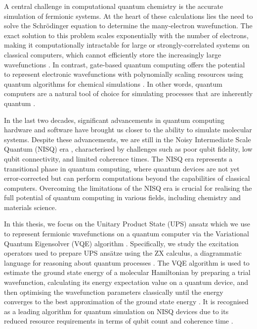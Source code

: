A central challenge in computational quantum chemistry is the accurate simulation of fermionic systems. At the heart of these calculations lies the need to solve the Schrödinger equation to determine the many-electron wavefunction. The exact solution to this problem scales exponentially with the number of electrons, making it computationally intractable for large or strongly-correlated systems on classical computers, which cannot efficiently store the increasingly large wavefunctions \cite{Szalay2011}. In contrast, gate-based quantum computing offers the potential to represent electronic wavefunctions with polynomially scaling resources using quantum algorithms for chemical simulations \cite{Kassal2011}. In other words, quantum computers are a natural tool of choice for simulating processes that are inherently quantum \cite{Yeung2020}.

In the last two decades, significant advancements in quantum computing hardware and software have brought us closer to the ability to simulate molecular systems. Despite these advancements, we are still in the Noisy Intermediate Scale Quantum (NISQ) era \cite{Preskill2018}, characterised by challenges such as poor qubit fidelity, low qubit connectivity, and limited coherence times. The NISQ era represents a transitional phase in quantum computing, where quantum devices are not yet error-corrected but can perform computations beyond the capabilities of classical computers. Overcoming the limitations of the NISQ era is crucial for realising the full potential of quantum computing in various fields, including chemistry and materials science.

In this thesis, we focus on the Unitary Product State (UPS) ansatz which we use to represent fermionic wavefunctions on a quantum computer \cite{Burton2023} via the Variational Quantum Eigensolver (VQE) algorithm \cite{Wecker2015}. Specifically, we study the excitation operators used to prepare UPS ansätze using the ZX calculus, a diagrammatic language for reasoning about quantum processes \cite{Coecke2011}. The VQE algorithm is used to estimate the ground state energy of a molecular Hamiltonian by preparing a trial wavefunction, calculating its energy expectation value on a quantum device, and then optimising the wavefunction parameters classically until the energy converges to the best approximation of the ground state energy \cite{McClean2016}. It is recognised as a leading algorithm for quantum simulation on NISQ devices due to its reduced resource requirements in terms of qubit count and coherence time \cite{Kirby2020}.

